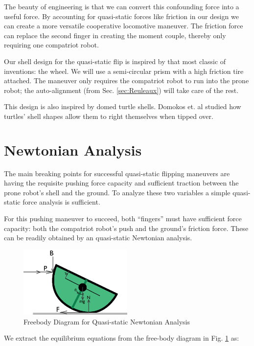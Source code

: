 \documentclass[letterpaper]{report}
\begin{document}
The beauty of engineering is that we can convert this confounding force into a useful force.
By accounting for quasi-static forces like friction in our design we can create a more versatile cooperative locomotive maneuver.
The friction force can replace the second finger in creating the moment couple, thereby only requiring one compatriot robot.

Our shell design for the quasi-static flip is inspired by that most classic of inventions: the wheel.
We will use a semi-circular prism with a high friction tire attached.
The maneuver only requires the compatriot robot to run into the prone robot; the auto-alignment (from Sec. \ref{sec:Reuleaux}) will take care of the rest.

This design is also inspired by domed turtle shells. Domokos et. al \cite{domokos2008geometry} studied how turtles' shell shapes allow them to right themselves when tipped over.

\section{Newtonian Analysis \label{sec:QS_NewtAnalysis}}
The main breaking points for successful quasi-static flipping maneuvers are having the requisite pushing force capacity and sufficient traction between the prone robot's shell and the ground.
To analyze these two variables a simple quasi-static force analysis is sufficient.

For this pushing maneuver to succeed, both ``fingers'' must have sufficient force capacity: both the compatriot robot's push and the ground's friction force.
These can be readily obtained by an quasi-static Newtonian analysis.

\begin{figure}[ht]
\centering
\includegraphics[width=0.5\textwidth]{QS_FreeBodyDiagram2.eps}
\caption{\label{f:QS_FBD}Freebody Diagram for Quasi-static Newtonian Analysis}
\end{figure}

We extract the equilibrium equations from the free-body diagram in Fig. \ref{f:QS_FBD} as:
\end{document}
